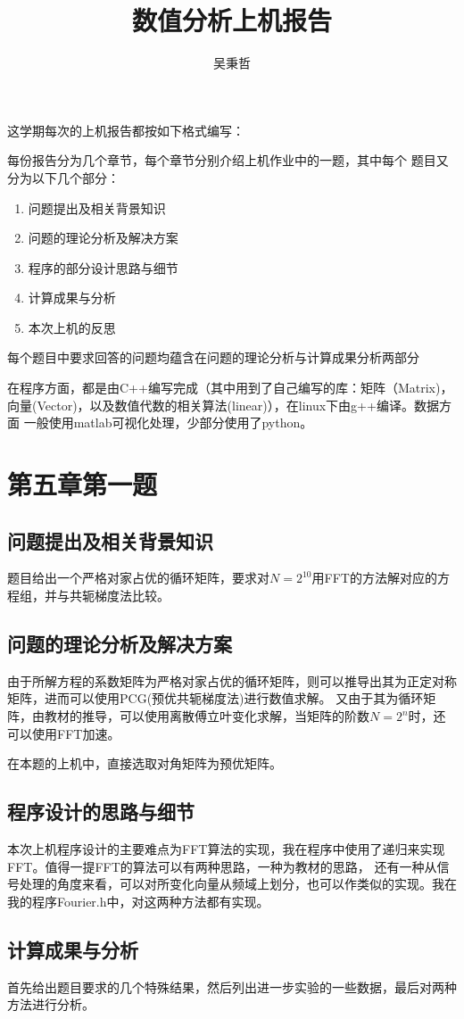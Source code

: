 \documentclass[10pt,a4paper]{ctexart}
\author{吴秉哲}
\title{数值分析上机报告}
\begin{document}
\maketitle
这学期每次的上机报告都按如下格式编写：

每份报告分为几个章节，每个章节分别介绍上机作业中的一题，其中每个
题目又分为以下几个部分：
\begin{enumerate}
\item 问题提出及相关背景知识
\item 问题的理论分析及解决方案
\item 程序的部分设计思路与细节
\item 计算成果与分析
\item 本次上机的反思
\end{enumerate}
每个题目中要求回答的问题均蕴含在问题的理论分析与计算成果分析两部分

在程序方面，都是由C++编写完成（其中用到了自己编写的库：矩阵（Matrix)，向量(Vector)，以及数值代数的相关算法(linear)），在linux下由g++编译。数据方面
一般使用matlab可视化处理，少部分使用了python。

\section{第五章第一题}
\subsection{问题提出及相关背景知识}
题目给出一个严格对家占优的循环矩阵，要求对$N=2^{10}$用FFT的方法解对应的方程组，并与共轭梯度法比较。
\subsection{问题的理论分析及解决方案}
由于所解方程的系数矩阵为严格对家占优的循环矩阵，则可以推导出其为正定对称矩阵，进而可以使用PCG(预优共轭梯度法)进行数值求解。
又由于其为循环矩阵，由教材的推导，可以使用离散傅立叶变化求解，当矩阵的阶数$N=2^n$时，还可以使用FFT加速。

在本题的上机中，直接选取对角矩阵为预优矩阵。
\subsection{程序设计的思路与细节}
本次上机程序设计的主要难点为FFT算法的实现，我在程序中使用了递归来实现FFT。值得一提FFT的算法可以有两种思路，一种为教材的思路，
还有一种从信号处理的角度来看，可以对所变化向量从频域上划分，也可以作类似的实现。我在我的程序Fourier.h中，对这两种方法都有实现。
\subsection{计算成果与分析}
首先给出题目要求的几个特殊结果，然后列出进一步实验的一些数据，最后对两种方法进行分析。
\end{document}

